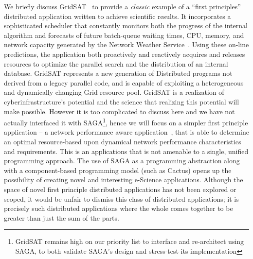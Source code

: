 \documentclass[10pt,letterpaper]{article}
\begin{document}
We briefly discuss GridSAT~\cite{gridsat03} to provide a {\it classic}
example of a ``first principles'' distributed application written to
achieve scientific results. It incorporates a sophisticated scheduler
that constantly monitors both the progress of the internal algorithm
and forecasts of future batch-queue waiting times, CPU, memory, and
network capacity generated by the Network Weather
Service~\cite{nws-arch,nws-handbook}.  Using these on-line
predictions, the application both proactively and reactively acquires
and releases resources to optimize the parallel search and the
distribution of an internal database.  GridSAT represents a new
generation of Distributed programs not derived from a legacy parallel
code, and is capable of exploiting a heterogeneous and dynamically
changing Grid resource pool.
GridSAT is a realization of cyberinfrastructure's potential and the
science that realizing this potential will make possible. However it
is too complicated to discuss here and we have not actually interfaced
it with SAGA\footnote{GridSAT remains high on our priority list to
  interface and re-architect using SAGA, to both validate SAGA's
  design and stress-test its implementation}, hence we will focus on a
simpler first principle application -- a network performance aware
application~\cite{saga_escience07}, that is able to determine an
optimal resource-based upon dynamical network performance
characteristics and requirements.  This is an applications that is not
amenable to a single, unified programming approach.  The use of SAGA as
a programming abstraction along with a component-based programming
model (such as Cactus) opens up the possibility of creating novel and
interesting e-Science applications.  Although the space of novel first
principle distributed applications has not been explored or scoped, it
would be unfair to dismiss this class of distributed applications; it
is precisely such distributed applications where the whole comes
together to be greater than just the sum of the parts.
\end{document}
